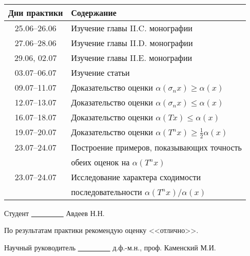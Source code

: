 \documentclass[a4paper,openbib]{report}
\renewcommand{\leq}{\leqslant}
\renewcommand{\geq}{\geqslant} %
\begin{document}

\begin{center}
	\begin{tabular}{|c|l|}
	\hline
	\textbf{Дни практики} & \textbf{Содержание} \\
	\hline
	25.06--26.06 & Изучение главы II.C. монографии \cite{wojtaszczyk1996banach}  \\
	\hline
	27.06--28.06 & Изучение главы II.D. монографии \cite{wojtaszczyk1996banach} \\
	\hline
	29.06, 02.07 & Изучение главы II.E. монографии \cite{wojtaszczyk1996banach} \\
	\hline
	03.07--06.07 & Изучение статьи \cite{Semenov2010invariant} \\
	\hline
	09.07--11.07 & Доказательство оценки $\alpha(\sigma_n x) \geq \alpha(x)$ \\
	\hline
	12.07--13.07 & Доказательство оценки $\alpha(\sigma_n x) \leq \alpha(x)$ \\
	\hline
	16.07--18.07 & Доказательство оценки $\alpha(T x) \leq \alpha(x)$ \\
	\hline
	19.07--20.07 & Доказательство оценки $\alpha(T^n x) \geq \frac{1}{2}\alpha(x)$ \\
	\hline
	23.07--24.07 & Построение примеров, показывающих точность \\ & обеих оценок на $\alpha(T^n x)$ \\
	\hline
	23.07--24.07 & Исследование характера сходимости \\ & последовательности $\alpha(T^n x)/\alpha(x)$ \\
	\hline
	\end{tabular}
\end{center}

\begingroup
	\let\clearpage\relax
	\printbibliography[title={\large Список литературы}]
\endgroup

\vspace{1em}

Студент \underline{~~~~~~~~~} Авдеев Н.Н.

\vspace{2em}

По результатам практики рекомендую оценку <<отлично>>.

\vspace{1em}

Научный руководитель \underline{~~~~~~~~~} д.ф.-м.н., проф. Каменский М.И.
\end{document}

